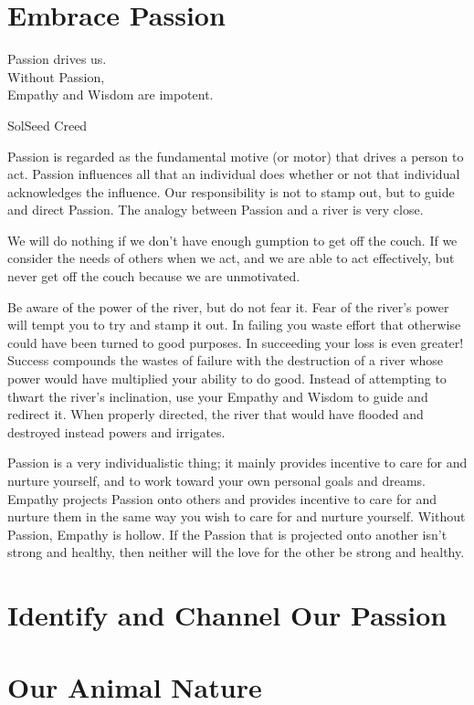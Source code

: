 \documentclass[ebook,12pt,openany,twoside]{memoir}
\newcommand{\tab}{\hspace*{2em}}
\newcommand{\imagefacingchapter}[1]{
  \cleartoverso
  \clearpage \null
  \thispagestyle{cleared}
  \AddToShipoutPictureBG*{%
    \AtStockLowerLeft{%
      \texttt{[image: \#1]}
    }
  }
  \clearpage
}
\begin{document}
\imagefacingchapter{images/WaterWheel}
\chapter{Embrace Passion}

\setlength\epigraphwidth{2.8in}
\epigraph{
  Passion drives us.\\
  Without Passion,\\
  \tab Empathy and Wisdom are impotent.
}{SolSeed Creed}

\noindent Passion is regarded as the fundamental motive (or motor) that drives
a person to act. Passion influences all that an individual does whether or not
that individual acknowledges the influence. Our responsibility is not to stamp
out, but to guide and direct Passion. The analogy between Passion and a river
is very close.

We will do nothing if we don't have enough gumption to get off the couch. If we
consider the needs of others when we act, and we are able to act effectively,
but never get off the couch because we are unmotivated.

Be aware of the power of the river, but do not fear it. Fear of the river's
power will tempt you to try and stamp it out. In failing you waste effort that
otherwise could have been turned to good purposes. In succeeding your loss is
even greater! Success compounds the wastes of failure with the destruction of a
river whose power would have multiplied your ability to do good. Instead of
attempting to thwart the river's inclination, use your Empathy and Wisdom to
guide and redirect it. When properly directed, the river that would have
flooded and destroyed instead powers and irrigates.

Passion is a very individualistic thing; it mainly provides incentive to care
for and nurture yourself, and to work toward your own personal goals and
dreams. Empathy projects Passion onto others and provides incentive to care for
and nurture them in the same way you wish to care for and nurture yourself.
Without Passion, Empathy is hollow. If the Passion that is projected onto
another isn't strong and healthy, then neither will the love for the other be
strong and healthy.

\chapter{Identify and Channel Our Passion}

\chapter{Our Animal Nature}
\end{document}
